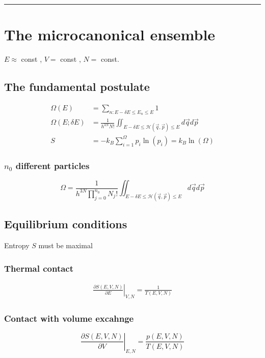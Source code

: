 \noindent\rule[1ex]{\textwidth/5}{1pt}
\section{The microcanonical ensemble}
$E \approx$ const , $V=$ const , $N=$ const.

\subsection*{The fundamental postulate}

\[
    \begin{aligned}
        \Omega(E) &= \sum_{n: E- \delta E \leq E_n \leq E} 1 \\
        \Omega(E; \delta E) &= \frac{1}{h^{3N} N!}  \iint_{E- \delta E \leq \mathcal{H}(\vec{q}, \vec{p}) \leq E} d \vec{q} d \vec{p} \\
        S &= -k_B \sum_{i=1}^\Omega p_i \ln (p_i) = k_B \ln (\Omega)
    \end{aligned}
\]

\subsubsection*{$n_0$ different particles}
\[
    \Omega = \frac{1}{h^{3N} \prod_{j=0}^{n_0}N_j!}  \iint_{E- \delta E \leq \mathcal{H}(\vec{q}, \vec{p}) \leq E} d \vec{q} d \vec{p}
\]

\subsection*{Equilibrium conditions}
Entropy $S$ must be maximal

\subsubsection*{Thermal contact}
\[
    \begin{aligned}
        \left. \frac{\partial S (E,V,N)}{\partial E} \right|_{V,N} = \frac{1}{T(E,V,N)}
    \end{aligned}
\]

\subsubsection*{Contact with volume excahnge}

\[
    \left. \frac{\partial S(E,V,N)}{\partial V} \right|_{E,N} = \frac{p(E,V,N)}{T(E,V,N)}
\]


